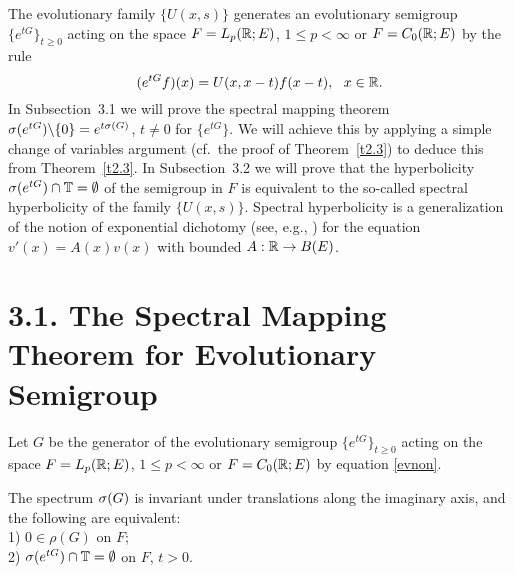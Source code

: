 The evolutionary family $\{U(x,s)\}$ generates an
evolutionary semigroup $\{e^{tG}\}_{t\geq 0}$ acting on the space
$F=L_p({\Bbb{R}};E)$, $1\leq p <\infty$
or $F=C_0 ({\Bbb{R}};E)$
by the rule
\begin{equation}\label{evnon}
(e^{tG}f)(x) =U(x,x-t) f(x-t),~~x\in{\Bbb{R}}.
\end{equation}
In Subsection~3.1
we will prove the spectral mapping theorem $\sigma(e^{tG})\backslash \{0\}
=e^{t\sigma (G)}$, $t\neq 0$ for $\{e^{tG}\}$.  We will
achieve this
by applying a simple change of variables argument
(cf.\ the proof of Theorem~\ref{t2.3}) to deduce this
from
Theorem~\ref{t2.3}.
In Subsection~3.2 we will prove
that the hyperbolicity $\sigma (e^{tG}) \cap {\Bbb{T}} =\emptyset$ of the semigroup
in $F$ is equivalent to the so-called spectral hyperbolicity of the family
$\{U(x,s)\}$.  Spectral hyperbolicity is a generalization of the notion of
exponential dichotomy
(see, e.g.,
\cite{9})
for the equation $v'(x) =A(x) v(x)$ with bounded $A:{\Bbb{R}}\to B(E)$.



\section*{3.1.  The Spectral Mapping Theorem for Evolutionary Semigroup}

Let $G$ be the generator of the evolutionary semigroup $\{e^{tG}\}_{t\geq
0}$ acting on the space
$F=L_p({\Bbb{R}};E)$, $1\leq p <\infty$
or $F=C_0 ({\Bbb{R}};E)$ by equation \eqref{evnon}.

\begin{thm}
The spectrum $\sigma (G)$ is invariant under translations along the
imaginary axis, and the following are equivalent:\\
1) $0\in \rho (G)$ on $F$;\\
2) $\sigma (e^{tG}) \cap {\Bbb{T}} =\emptyset$ on $F$,
$t>0$.
\end{thm}

